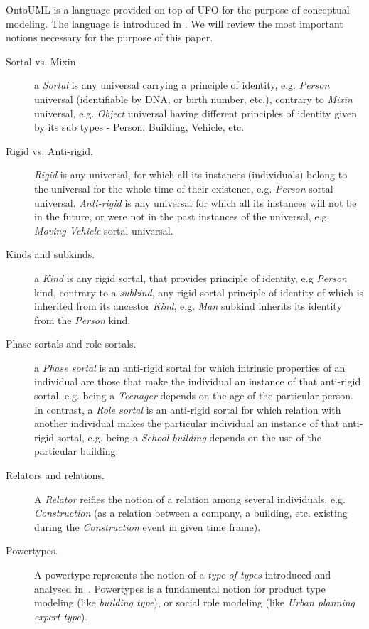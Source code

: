 \documentclass{lncs-template/llncs}
\begin{document}
OntoUML is a language provided on top of UFO for the purpose of conceptual modeling. The language is introduced in \cite{g2006ofscm}. We will review the most important notions necessary for the purpose of this paper.
\begin{description}
 \item[Sortal vs. Mixin.] a \emph{Sortal} is any universal carrying a principle of identity, e.g. \emph{Person} universal (identifiable by DNA, or birth number, etc.), contrary to \emph{Mixin} universal, e.g. \emph{Object} universal having different principles of identity given by its sub types - Person, Building, Vehicle, etc. 
 \item[Rigid vs. Anti-rigid.] \emph{Rigid} is any universal, for which all its instances (individuals) belong to the universal for the whole time of their existence, e.g. \emph{Person} sortal universal. \emph{Anti-rigid} is any universal for which all its instances will not be in the future, or were not in the past instances of the universal, e.g. \emph{Moving Vehicle} sortal universal.
 \item[Kinds and subkinds.] a \emph{Kind} is any rigid sortal, that provides principle of identity, e.g \emph{Person} kind, contrary to a \emph{subkind}, any rigid sortal principle of identity of which is inherited from its ancestor \emph{Kind}, e.g. \emph{Man} subkind inherits its identity from the \emph{Person} kind.
 \item[Phase sortals and role sortals.] a \emph{Phase sortal} is an anti-rigid sortal for which intrinsic properties of an individual are those that make the individual an instance of that anti-rigid sortal, e.g. being a \emph{Teenager} depends on the age of the particular person. In contrast, a \emph{Role sortal} is an anti-rigid sortal for which relation with another individual makes the particular individual an instance of that anti-rigid sortal, e.g. being a \emph{School building} depends on the use of the particular building.
 \item[Relators and relations.] A \emph{Relator} reifies the notion of a relation among several individuals, e.g. \emph{Construction} (as a relation between a company, a building, etc. existing during the \emph{Construction} event in given time frame).
 \item[Powertypes.] A powertype represents the notion of a \emph{type of types} introduced and analysed in~\cite{gpagc2015toap}.
 Powertypes is a fundamental notion for product type modeling (like \emph{building type}), or social role modeling (like \emph{Urban planning expert type}).
\end{description} 
 
\end{document}
